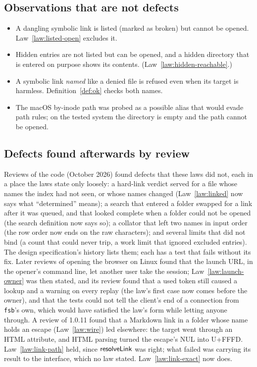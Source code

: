 \subsection{Observations that are not defects}

\begin{itemize}
  \item A dangling symbolic link is listed (marked as broken) but cannot be
        opened.  Law~\ref{law:listed-open} excludes it.
  \item Hidden entries are not listed but can be opened, and a hidden directory
        that is entered on purpose shows its contents.
        (Law~\ref{law:hidden-reachable}.)
  \item A symbolic link \emph{named} like a denied file is refused even when its
        target is harmless.  Definition~\ref{def:ok} checks both names.
  \item The macOS by-inode path  was probed as a
        possible alias that would evade path rules; on the tested system the
        directory is empty and the path cannot be opened.
\end{itemize}

\subsection{Defects found afterwards by review}

Reviews of the code (October 2026) found defects that these laws did not, each in
a place the laws state only loosely: a hard-link verdict served for a file whose
names the index had not seen, or whose names changed (Law~\ref{law:linked} now says
what ``determined'' means); a search that entered a folder swapped for a link after it
was queued, and that looked complete when a folder could not be opened (the search
definition now says so); a collator that left two names in input order (the row order
now ends on the raw characters); and several limits that did not bind (a count that could
never trip, a work limit that ignored excluded entries).  The design specification's
history lists them; each has a test that fails without its fix.  Later reviews of
opening the browser on Linux found that the launch URL, in the opener's command line,
let another user take the session; Law~\ref{law:launch-owner} was then stated, and its
review found that a used token still caused a lookup and a warning on every replay (the
law's first case now comes before the owner), and that the tests could not tell the
client's end of a connection from \texttt{fsb}'s own, which would have satisfied the
law's form while letting anyone through.  A review of 1.0.11 found that a Markdown link
in a folder whose name holds an escape (Law~\ref{law:wire}) led elsewhere: the target
went through an HTML attribute, and HTML parsing turned the escape's NUL into U+FFFD.
Law~\ref{law:link-path} held, since $\mathsf{resolveLink}$ was right; what failed was carrying its
result to the interface, which no law stated.  Law~\ref{law:link-exact} now does.

